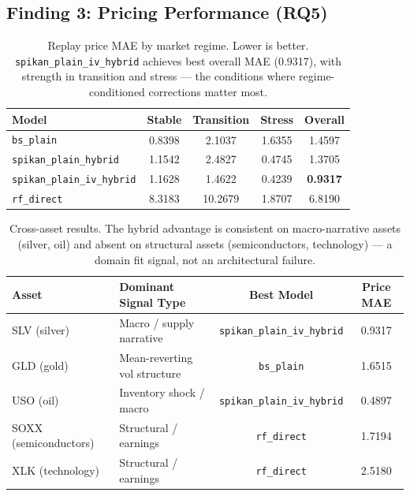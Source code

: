 \documentclass[11pt,a4paper]{article}
\begin{document}
\subsection{Finding 3: Pricing Performance (RQ5)}
\label{sec:experiments:pricing}

\begin{table}[ht]
\centering
\caption{Replay price MAE by market regime. Lower is better.
\texttt{spikan\_plain\_iv\_hybrid} achieves best overall MAE (0.9317), with strength
in transition and stress --- the conditions where regime-conditioned corrections
matter most.}
\begin{tabular}{@{}lcccc@{}}
\toprule
Model & Stable & Transition & Stress & Overall \\ \midrule
\texttt{bs\_plain} & 0.8398 & 2.1037 & 1.6355 & 1.4597 \\
\texttt{spikan\_plain\_hybrid} & 1.1542 & 2.4827 & 0.4745 & 1.3705 \\
\texttt{spikan\_plain\_iv\_hybrid} & 1.1628 & 1.4622 & 0.4239 & \textbf{0.9317} \\
\texttt{rf\_direct} & 8.3183 & 10.2679 & 1.8707 & 6.8190 \\
\bottomrule
\end{tabular}
\label{tab:replay}
\end{table}

\begin{table}[ht]
\centering
\caption{Cross-asset results. The hybrid advantage is consistent on macro-narrative
assets (silver, oil) and absent on structural assets (semiconductors, technology) ---
a domain fit signal, not an architectural failure.}
\begin{tabular}{@{}llcc@{}}
\toprule
Asset & Dominant Signal Type & Best Model & Price MAE \\ \midrule
SLV (silver) & Macro / supply narrative & \texttt{spikan\_plain\_iv\_hybrid} & 0.9317 \\
GLD (gold) & Mean-reverting vol structure & \texttt{bs\_plain} & 1.6515 \\
USO (oil) & Inventory shock / macro & \texttt{spikan\_plain\_iv\_hybrid} & 0.4897 \\
SOXX (semiconductors) & Structural / earnings & \texttt{rf\_direct} & 1.7194 \\
XLK (technology) & Structural / earnings & \texttt{rf\_direct} & 2.5180 \\
\bottomrule
\end{tabular}
\label{tab:cross_asset}
\end{table}
\end{document}
